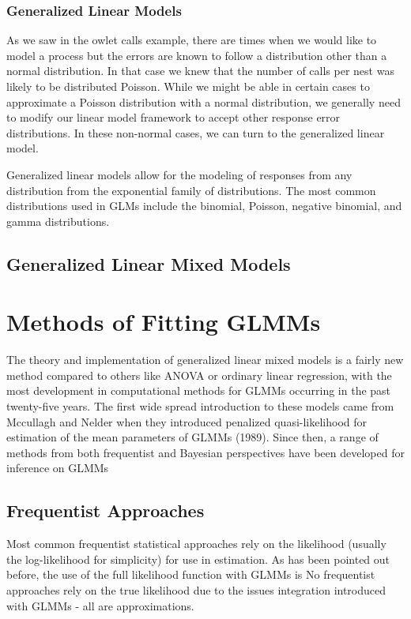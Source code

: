 \documentclass{article}\usepackage[]{graphicx}\usepackage[]{color}
\begin{document}
\subsubsection{Generalized Linear Models}

As we saw in the owlet calls example, there are times when we would like to model a process but the errors are known to follow a distribution other than a normal distribution. In that case we knew that the number of calls per nest was likely to be distributed Poisson. While we might be able in certain cases to approximate a Poisson distribution with a normal distribution, we generally need to modify our linear model framework to accept other response error distributions. In these non-normal cases, we can turn to the generalized linear model.

Generalized linear models allow for the modeling of responses from any distribution from the exponential family of distributions. The most common distributions used in GLMs include the binomial, Poisson, negative binomial, and gamma distributions. 

\subsection{Generalized Linear Mixed Models}



\section{Methods of Fitting GLMMs}

The theory and implementation of generalized linear mixed models is a fairly new method compared to others like ANOVA or ordinary linear regression, with the most development in computational methods for GLMMs occurring in the past twenty-five years. The first wide spread introduction to these models came from Mccullagh and Nelder when they introduced penalized quasi-likelihood for estimation of the mean parameters of GLMMs (1989). Since then, a range of methods from both frequentist and Bayesian perspectives have been developed for inference on GLMMs 

\subsection{Frequentist Approaches}

Most common frequentist statistical approaches rely on the likelihood (usually the log-likelihood for simplicity) for use in estimation. As has been pointed out before, the use of the full likelihood function with GLMMs is  No frequentist approaches rely on the true likelihood due to the issues integration introduced with GLMMs - all are approximations. 
\end{document}
